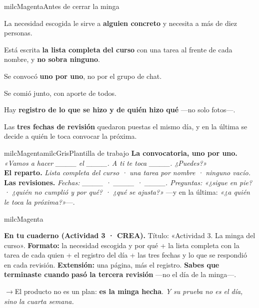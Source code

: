 \documentclass[11pt,letterpaper]{article}
\newcommand{\puente}[1]{%
  \begin{puentebox}%
    \textcolor{milcGradeDark}{$\rightarrow$}\hspace{2mm}#1%
  \end{puentebox}%
}
\begin{document}
\begin{drawbox}{milcMagenta}{Antes de cerrar la minga}
\begin{checklista}
\item La necesidad escogida le sirve a \textbf{alguien concreto} y necesita a más de diez personas.
\item Está escrita \textbf{la lista completa del curso} con una tarea al frente de cada nombre, y \textbf{no sobra ninguno}.
\item Se convocó \textbf{uno por uno}, no por el grupo de chat.
\item Se comió junto, con aporte de todos.
\item Hay \textbf{registro de lo que se hizo y de quién hizo qué} ---no solo fotos---.
\item Las \textbf{tres fechas de revisión} quedaron puestas el mismo día, y en la última se decide a quién le toca convocar la próxima.
\end{checklista}
\end{drawbox}

\begin{softbox}{milcMagenta}{milcGris}{Plantilla de trabajo}
\textbf{La convocatoria, uno por uno.} \emph{«Vamos a hacer \_\_\_\_ el \_\_\_\_. A ti te toca \_\_\_\_. ¿Puedes?»} \\[1mm]
\textbf{El reparto.} \emph{Lista completa del curso · una tarea por nombre · ninguno vacío.} \\[1mm]
\textbf{Las revisiones.} \emph{Fechas: \_\_\_\_ · \_\_\_\_ · \_\_\_\_. Preguntas: «¿sigue en pie? · ¿quién no cumplió y por qué? · ¿qué se ajusta?»} ---y en la última: \emph{«¿a quién le toca la próxima?»}---.
\end{softbox}

\begin{infoband}{milcMagenta}


\textbf{En tu cuaderno (Actividad 3 · CREA).} Título: «Actividad 3. La minga del curso». \textbf{Formato:} la necesidad escogida y por qué + la lista completa con la tarea de cada quien + el registro del día + las tres fechas y lo que se respondió en cada revisión. \textbf{Extensión:} una página, más el registro. \textbf{Sabes que terminaste cuando} \textbf{pasó la tercera revisión} ---no el día de la minga---.
\end{infoband}

\puente{El producto no es un plan: \textbf{es la minga hecha}. \emph{Y su prueba no es el día, sino la cuarta semana.}}
\end{document}
